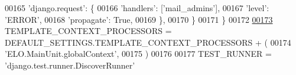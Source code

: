 \begin{DoxyCode}
00165         \textcolor{stringliteral}{'django.request'}: \{
00166             \textcolor{stringliteral}{'handlers'}: [\textcolor{stringliteral}{'mail\_admins'}],
00167             \textcolor{stringliteral}{'level'}: \textcolor{stringliteral}{'ERROR'},
00168             \textcolor{stringliteral}{'propagate'}: \textcolor{keyword}{True},
00169         \},
00170     \}
00171 \}
00172 
\hypertarget{settings_8py_source_l00173}{}\hyperlink{namespaceELO_1_1settings_ad62b51880946e9380913c2f3811311bf}{00173} TEMPLATE\_CONTEXT\_PROCESSORS = DEFAULT\_SETTINGS.TEMPLATE\_CONTEXT\_PROCESSORS + (
00174     \textcolor{stringliteral}{'ELO.MainUnit.globalContext'},
00175 )
00176 
00177 TEST\_RUNNER = \textcolor{stringliteral}{'django.test.runner.DiscoverRunner'}
\end{DoxyCode}
